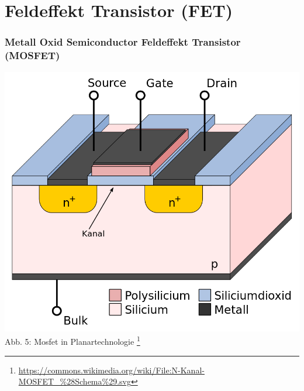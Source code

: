 \section*{Feldeffekt Transistor (FET)}
\begin{frame}
\frametitle{Metall Oxid Semiconductor Feldeffekt Transistor (MOSFET)}
\begin{center}
	\includegraphics[scale=0.2]{e13/N-Kanal-MOSFET.png}\\
	Abb. 5: Mosfet in Planartechnologie
	\footnote{\url{https://commons.wikimedia.org/wiki/File:N-Kanal-MOSFET_\%28Schema\%29.svg}}\\
\end{center}
\end{frame}

